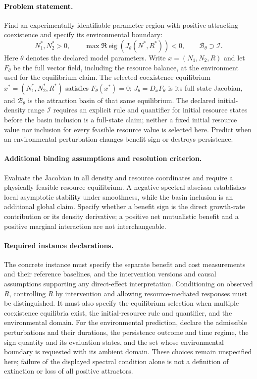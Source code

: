 \documentclass[11pt]{article}
\begin{document}
\paragraph{Problem statement.} Find an experimentally identifiable parameter region with positive attracting coexistence and specify its environmental boundary:
\[
 N_1^*,N_2^*>0,\qquad
 \max\Re\operatorname{eig}(J_\theta(N^*,R^*))<0,
 \qquad \mathcal B_\theta\supset\mathcal I.
\]
Here $\theta$ denotes the declared model parameters. Write $x=(N_1,N_2,R)$ and let $F_\theta$ be the full vector field, including the resource balance, at the environment used for the equilibrium claim. The selected coexistence equilibrium $x^*=(N_1^*,N_2^*,R^*)$ satisfies $F_\theta(x^*)=0$; $J_\theta=D_xF_\theta$ is its full state Jacobian, and $\mathcal B_\theta$ is the attraction basin of that same equilibrium. The declared initial-density range $\mathcal I$ requires an explicit rule and quantifier for initial resource states before the basin inclusion is a full-state claim; neither a fixed initial resource value nor inclusion for every feasible resource value is selected here. Predict when an environmental perturbation changes benefit sign or destroys persistence.
\paragraph{Additional binding assumptions and resolution criterion.} Evaluate the Jacobian in all density and resource coordinates and require a physically feasible resource equilibrium. A negative spectral abscissa establishes local asymptotic stability under smoothness, while the basin inclusion is an additional global claim. Specify whether a benefit sign is the direct growth-rate contribution or its density derivative; a positive net mutualistic benefit and a positive marginal interaction are not interchangeable.
\paragraph{Required instance declarations.} The concrete instance must specify the separate benefit and cost measurements and their reference baselines, and the intervention versions and causal assumptions supporting any direct-effect interpretation. Conditioning on observed $R$, controlling $R$ by intervention and allowing resource-mediated responses must be distinguished. It must also specify the equilibrium selection when multiple coexistence equilibria exist, the initial-resource rule and quantifier, and the environmental domain. For the environmental prediction, declare the admissible perturbations and their durations, the persistence outcome and time regime, the sign quantity and its evaluation states, and the set whose environmental boundary is requested with its ambient domain. These choices remain unspecified here; failure of the displayed spectral condition alone is not a definition of extinction or loss of all positive attractors.
\end{document}
